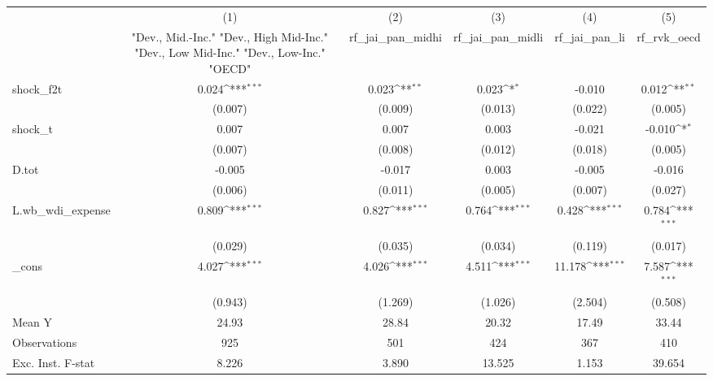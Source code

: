{
\def\sym#1{\ifmmode^{#1}\else\(^{#1}\)\fi}
\begin{tabular}{l*{5}{c}}
\toprule
            &\multicolumn{1}{c}{(1)}&\multicolumn{1}{c}{(2)}&\multicolumn{1}{c}{(3)}&\multicolumn{1}{c}{(4)}&\multicolumn{1}{c}{(5)}\\
            &\multicolumn{1}{c}{ "Dev., Mid.-Inc." "Dev., High Mid-Inc." "Dev., Low Mid-Inc." "Dev., Low-Inc." "OECD" }&\multicolumn{1}{c}{rf\_jai\_pan\_midhi}&\multicolumn{1}{c}{rf\_jai\_pan\_midli}&\multicolumn{1}{c}{rf\_jai\_pan\_li}&\multicolumn{1}{c}{rf\_rvk\_oecd}\\
\midrule
shock\_f2t   &       0.024\sym{***}&       0.023\sym{**} &       0.023\sym{*}  &      -0.010         &       0.012\sym{**} \\
            &     (0.007)         &     (0.009)         &     (0.013)         &     (0.022)         &     (0.005)         \\
\addlinespace
shock\_t     &       0.007         &       0.007         &       0.003         &      -0.021         &      -0.010\sym{*}  \\
            &     (0.007)         &     (0.008)         &     (0.012)         &     (0.018)         &     (0.005)         \\
\addlinespace
D.tot       &      -0.005         &      -0.017         &       0.003         &      -0.005         &      -0.016         \\
            &     (0.006)         &     (0.011)         &     (0.005)         &     (0.007)         &     (0.027)         \\
\addlinespace
L.wb\_wdi\_expense&       0.809\sym{***}&       0.827\sym{***}&       0.764\sym{***}&       0.428\sym{***}&       0.784\sym{***}\\
            &     (0.029)         &     (0.035)         &     (0.034)         &     (0.119)         &     (0.017)         \\
\addlinespace
\_cons      &       4.027\sym{***}&       4.026\sym{***}&       4.511\sym{***}&      11.178\sym{***}&       7.587\sym{***}\\
            &     (0.943)         &     (1.269)         &     (1.026)         &     (2.504)         &     (0.508)         \\
\midrule
Mean Y      &       24.93         &       28.84         &       20.32         &       17.49         &       33.44         \\
Observations&         925         &         501         &         424         &         367         &         410         \\
Exc. Inst. F-stat&       8.226         &       3.890         &      13.525         &       1.153         &      39.654         \\
\bottomrule
\end{tabular}
}
